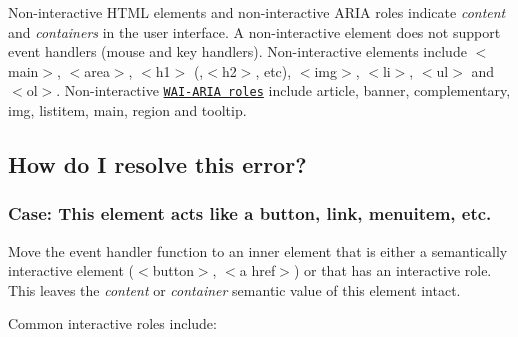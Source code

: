 Non-\/interactive H\+T\+ML elements and non-\/interactive A\+R\+IA roles indicate {\itshape content} and {\itshape containers} in the user interface. A non-\/interactive element does not support event handlers (mouse and key handlers). Non-\/interactive elements include {\ttfamily $<$main$>$}, {\ttfamily $<$area$>$}, {\ttfamily $<$h1$>$} (,{\ttfamily $<$h2$>$}, etc), {\ttfamily $<$img$>$}, {\ttfamily $<$li$>$}, {\ttfamily $<$ul$>$} and {\ttfamily $<$ol$>$}. Non-\/interactive \href{https://www.w3.org/TR/wai-aria-1.1/#usage_intro}{\tt W\+A\+I-\/\+A\+R\+IA roles} include {\ttfamily article}, {\ttfamily banner}, {\ttfamily complementary}, {\ttfamily img}, {\ttfamily listitem}, {\ttfamily main}, {\ttfamily region} and {\ttfamily tooltip}.

\subsection*{How do I resolve this error?}

\subsubsection*{Case\+: This element acts like a button, link, menuitem, etc.}

Move the event handler function to an inner element that is either a semantically interactive element ({\ttfamily $<$button$>$}, {\ttfamily $<$a href$>$}) or that has an interactive role. This leaves the {\itshape content} or {\itshape container} semantic value of this element intact.

Common interactive roles include\+:


